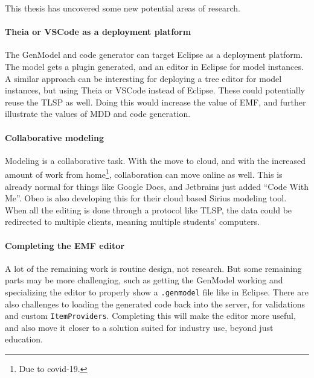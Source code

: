 This thesis has uncovered some new potential areas of research.

\paragraph{Theia or VSCode as a deployment platform}
The GenModel and code generator can target \gls{Eclipse} as a deployment platform.
The model gets a plugin generated, and an editor in \gls{Eclipse} for model instances.
A similar approach can be interesting for deploying a tree editor for model instances, but using \gls{Theia} or \gls{VSCode} instead of \gls{Eclipse}.
These could potentially reuse the \acrshort{TLSP} as well.
Doing this would increase the value of \acrshort{EMF}, and further illustrate the values of \acrlong{MDD} and code generation.

\paragraph{Collaborative modeling}
Modeling is a collaborative task.
With the move to cloud, and with the increased amount of work from home\footnote{Due to covid-19.}, collaboration can move online as well.
This is already normal for things like Google Docs, and Jetbrains just added ``Code With Me''.
Obeo is also developing this for their cloud based Sirius modeling tool.
When all the editing is done through a protocol like \acrshort{TLSP}, the data could be redirected to multiple clients, meaning multiple students' computers.

\paragraph{Completing the EMF editor}
A lot of the remaining work is routine design, not research.
But some remaining parts may be more challenging, such as getting the GenModel working and specializing the editor to properly show a \texttt{.genmodel} file like in \gls{Eclipse}.
There are also challenges to loading the generated code back into the server, for validations and custom \texttt{ItemProviders}.
Completing this will make the editor more useful, and also move it closer to a solution suited for industry use, beyond just education.


